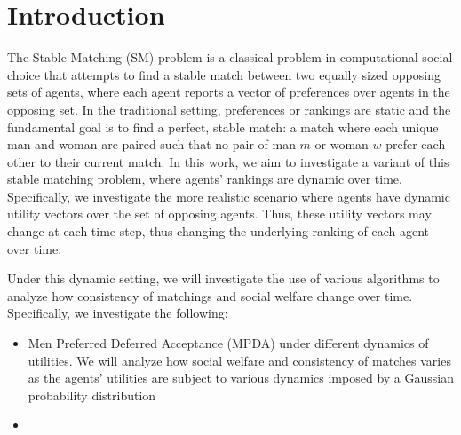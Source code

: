 \section{Introduction}
 
The Stable Matching (SM) problem is a classical problem in computational social choice that attempts to find a stable match between two equally sized opposing sets of agents, where each agent reports a vector of preferences over agents in the opposing set. In the traditional setting, preferences or rankings are static and the fundamental goal is to find a perfect, stable match: a match where each unique man and woman are paired such that no pair of man $m$ or woman $w$ prefer each other to their current match. In this work, we aim to investigate a variant of this stable matching problem, where agents' rankings are dynamic over time. Specifically, we investigate the more realistic scenario where agents have dynamic utility vectors over the set of opposing agents. Thus, these utility vectors may change at each time step, thus changing the underlying ranking of each agent over time.

Under this dynamic setting, we will investigate the use of various algorithms to analyze how consistency of matchings and social welfare change over time. Specifically, we investigate the following:
\begin{itemize}
    \item Men Preferred Deferred Acceptance (MPDA) under different dynamics of utilities. We will analyze how social welfare and consistency of matches varies as the agents' utilities are subject to various dynamics imposed by a Gaussian probability distribution
    \item
\end{itemize}